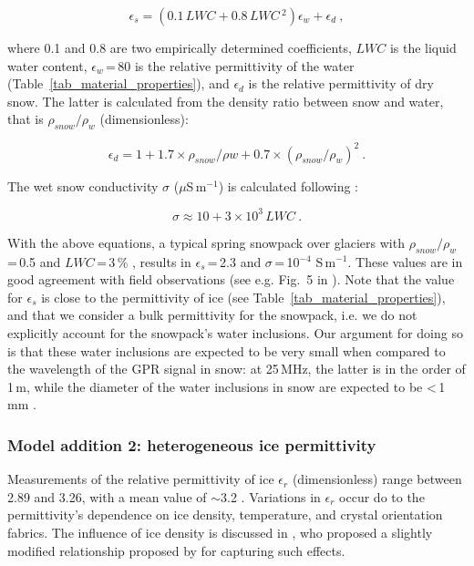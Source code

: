 \begin{equation}
      \epsilon_s = (0.1\,LWC + 0.8\,LWC\,^2)\epsilon_w + \epsilon_d~,
       \label{eq:epsilon_wet}
\end{equation}

where 0.1 and 0.8 are two empirically determined coefficients, $LWC$ is the liquid water content, $\epsilon_w$\,=\,80 is the relative permittivity of the water (Table~\ref{tab_material_properties}), and $\epsilon_d$ is the relative permittivity of dry snow. The latter is calculated from the density ratio between snow and water, that is $\rho_{snow}/\rho_{w}$ (dimensionless): 

\begin{equation}
  \epsilon_d = 1 + 1.7\times\rho_{snow}/\rho{w} + 0.7\times(\rho_{snow}/\rho_{w})^2~.
  \label{eq:epsilon_dry}
\end{equation}

The wet snow conductivity $\sigma$ ($\mu$S\,m$^{-1}$) is calculated following \cite{Granlund&al2010}:

\begin{equation}
    \sigma \approx  10 + 3\times10^3\,LWC~.
    \label{eq:sigma_wet_snow}
\end{equation}

With the above equations, a typical spring snowpack over glaciers with $\rho_{snow}/\rho_w$\,=\,0.5 and $LWC$\,=\,3\,\% \citep{Griessinger&al2018}, results in $\epsilon_s$\,=\,2.3 and $\sigma$\,=\,10$^{-4}$ S\,m$^{-1}$. These values are in good agreement with field observations (see e.g. Fig.~5 in \cite{Evans1965}). Note that the value for $\epsilon_s$ is close to the permittivity of ice (see Table~\ref{tab_material_properties}), and that we consider a bulk permittivity for the snowpack, i.e. we do not explicitly account for the snowpack's water inclusions. Our argument for doing so is that these water inclusions are expected to be very small when compared to the wavelength of the GPR signal in snow: at 25\,MHz, the latter is in the order of 1\,m, while the diameter of the water inclusions in snow are expected to be <\,1\,mm \citep[e.g.][]{Coleou&al2001}.  

\subsubsection{Model addition 2: heterogeneous ice permittivity}
\label{sec:stoch_mod}

Measurements of the relative permittivity of ice $\epsilon_r$ (dimensionless) range between 2.89 and 3.26, with a mean value of $\sim$3.2 \citep{Reynolds2011, Johari&Charette1975, Robin&al1969, Plewes&Hubbard2001, Bohleber2012, Jezek&al1978}. Variations in  $\epsilon_r$ occur do to the permittivity's dependence on ice density, temperature, and crystal orientation fabrics. The influence of ice density is discussed in \cite{Kovacs&al1995}, who proposed a slightly modified relationship proposed by \cite{Robin&al1969} for capturing such effects. 

